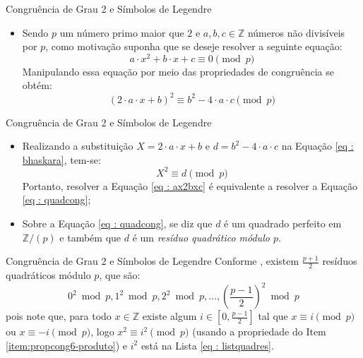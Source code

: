 \begin{frame}[fragile]{Congruência de Grau 2 e Símbolos de Legendre}
    \begin{itemize}
        \item Sendo $p$ um número primo maior que $2$ e $a,b,c \in \mathbb{Z}$ números não divisíveis por $p$, como motivação suponha que se deseje resolver a seguinte equação:
        \begin{equation} \label{eq : ax2bxc}
            a \cdot x^2 + b \cdot x + c \equiv 0 \pmod p
        \end{equation}
        Manipulando essa equação por meio das propriedades de congruência se obtém:
        \begin{equation} \label{eq : bhaskara}
            (2 \cdot a \cdot x + b)^2 \equiv b^2 - 4 \cdot a \cdot c \pmod p
        \end{equation}
    \end{itemize}
\end{frame}

\begin{frame}[fragile]{Congruência de Grau 2 e Símbolos de Legendre}
    \begin{itemize}
        \item Realizando a substituição $X = 2 \cdot a \cdot x + b$ e $d = b^2 - 4 \cdot a \cdot c$ na Equação \ref{eq : bhaskara}, tem-se:
        \begin{equation} \label{eq : quadcong}
            X^2 \equiv d \pmod p
        \end{equation}
        Portanto, resolver a Equação \ref{eq : ax2bxc} é equivalente a resolver a Equação \ref{eq : quadcong};

    \item Sobre a Equação \ref{eq : quadcong}, se diz que $d$ é um quadrado perfeito em $\mathbb{Z}/(p)$ e também que $d$ é um \textit{resíduo quadrático módulo $p$}.
    
    \end{itemize}
\end{frame}

\begin{frame}[fragile]{Congruência de Grau 2 e Símbolos de Legendre}
    Conforme \cite{book:2399854}, existem $\frac{p+1}{2}$ resíduos quadráticos módulo $p$, que são:
        \begin{equation} \label{eq : listquadres}
            0^2 \bmod{p}, 1^2 \bmod{p}, 2^2 \bmod{p}, ..., \left(\frac{p -1}{2} \right)^2 \bmod{p} 
        \end{equation}
    pois note que, para todo $x \in \mathbb{Z}$ existe algum $i \in [0, \frac{p-1}{2}]$ tal que $x \equiv i \pmod{p}$ ou $x \equiv -i \pmod{p}$, logo $x^2 \equiv i^2 \pmod{p}$ (usando a propriedade do Item \ref{item:propcong6-produto}) e $i^2$ está na Lista \ref{eq : listquadres}.
\end{frame}

